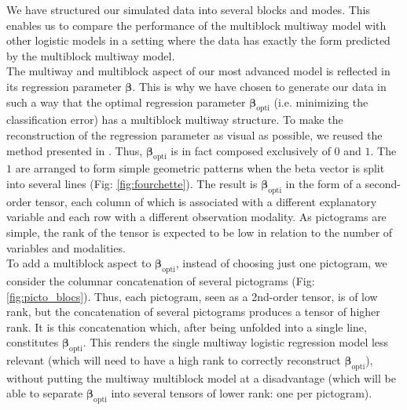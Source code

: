 \documentclass[preprint,12pt]{elsarticle}
\begin{document}
We have structured our simulated data into several blocks and modes. This enables us to compare the performance of the multiblock multiway model with other logistic models in a setting where the data has exactly the form predicted by the multiblock multiway model.\\
\indent The multiway and multiblock aspect of our most advanced model is reflected in its regression parameter $\bm{\beta}$. This is why we have chosen to generate our data in such a way that the optimal regression parameter $\bm{\beta}_{\text{opti}}$ (i.e. minimizing the classification error) has a multiblock multiway structure. To make the reconstruction of the regression parameter as visual as possible, we reused the method presented in \cite{picto}. Thus, $\bm{\beta}_{\text{opti}}$ is in fact composed exclusively of $0$ and $1$. The $1$ are arranged to form simple geometric patterns when the beta vector is split into several lines (Fig: \ref{fig:fourchette}). The result is $\bm{\beta}_{\text{opti}}$ in the form of a second-order tensor, each column of which is associated with a different explanatory variable and each row with a different observation modality. As pictograms are simple, the rank of the tensor is expected to be low in relation to the number of variables and modalities.\\
\indent To add a multiblock aspect to $\bm{\beta}_{\text{opti}}$, instead of choosing just one pictogram, we consider the columnar concatenation of several pictograms (Fig: \ref{fig:picto_blocs}). Thus, each pictogram, seen as a 2nd-order tensor, is of low rank, but the concatenation of several pictograms produces a tensor of higher rank. It is this concatenation which, after being unfolded into a single line, constitutes $\bm{\beta}_{\text{opti}}$. This renders the single multiway logistic regression model less relevant (which will need to have a high rank to correctly reconstruct $\bm{\beta}_{\text{opti}}$), without putting the multiway multiblock model at a disadvantage (which will be able to separate $\bm{\beta}_{\text{opti}}$ into several tensors of lower rank: one per pictogram).
\end{document}
